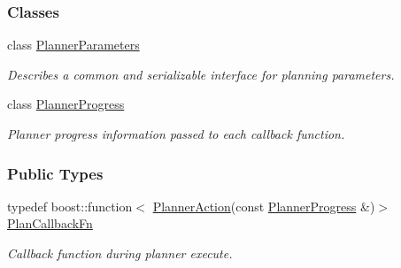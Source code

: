 \subsubsection*{Classes}
\begin{DoxyCompactItemize}
\item 
class \hyperlink{classOpenRAVE_1_1PlannerBase_1_1PlannerParameters}{PlannerParameters}
\begin{DoxyCompactList}\small\item\em Describes a common and serializable interface for planning parameters. \item\end{DoxyCompactList}\item 
class \hyperlink{classOpenRAVE_1_1PlannerBase_1_1PlannerProgress}{PlannerProgress}
\begin{DoxyCompactList}\small\item\em Planner progress information passed to each callback function. \item\end{DoxyCompactList}\end{DoxyCompactItemize}
\subsubsection*{Public Types}
\begin{DoxyCompactItemize}
\item 
typedef boost::function$<$ \hyperlink{namespaceOpenRAVE_a16104fe58cdf1075c47eb709e58ba853}{PlannerAction}(const \hyperlink{classOpenRAVE_1_1PlannerBase_1_1PlannerProgress}{PlannerProgress} \&)$>$ \hyperlink{classOpenRAVE_1_1PlannerBase_af66cf367615e6c51bab4473f4fcf1018}{PlanCallbackFn}
\begin{DoxyCompactList}\small\item\em Callback function during planner execute. \item\end{DoxyCompactList}\end{DoxyCompactItemize}
